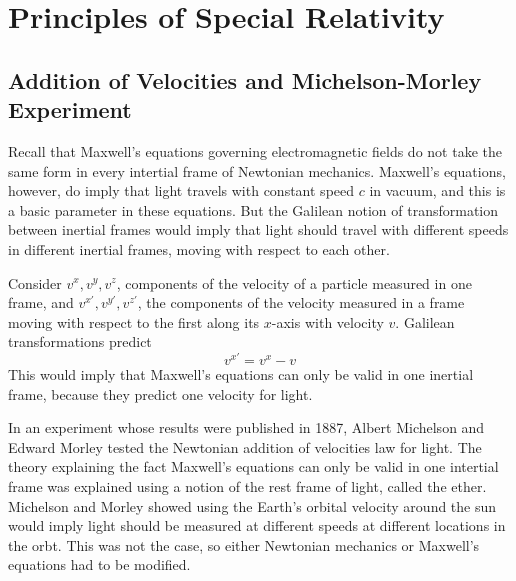 %
%
%
\chapter{Principles of Special Relativity}
\label{PrinSpec} %




\section{Addition of Velocities and Michelson-Morley Experiment}
\label{sec:addVel}

Recall that Maxwell's equations governing electromagnetic fields do not take the same form in every intertial frame of Newtonian mechanics. Maxwell's equations, however, do imply that light travels with constant speed $c$ in vacuum, and this is a basic parameter in these equations. But the Galilean notion of transformation between inertial frames would imply that light should travel with different speeds in different inertial frames, moving with respect to each other.

Consider $v^x,v^y,v^z$, components of the velocity of a particle measured in one frame, and $v^{x'},v^{y'},v^{z'}$, the components of the velocity measured in a frame moving with respect to the first along its $x$-axis with velocity $v$. Galilean transformations predict $$v^{x'}=v^x-v$$
This would imply that Maxwell's equations can only be valid in one inertial frame, because they predict one velocity for light.

\begin{rmk}
    In an experiment whose results were published in 1887, Albert Michelson and Edward Morley tested the Newtonian addition of velocities law for light. The theory explaining the fact Maxwell's equations can only be valid in one intertial frame was explained using a notion of the rest frame of light, called the ether. Michelson and Morley showed using the Earth's orbital velocity around the sun would imply light should be measured at different speeds at different locations in the orbt. This was not the case, so either Newtonian mechanics or Maxwell's equations had to be modified.
\end{rmk}



